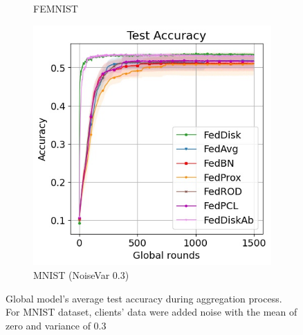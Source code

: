 \documentclass[journal]{IEEEtai}
\begin{document}
\begin{figure}[ht!]
\begin{subfigure}[t]{0.3\linewidth}
		\caption{FEMNIST}
		\label{fig:acc_femnist}
	\end{subfigure}
	\hspace{0.01em}%
	\begin{subfigure}[t]{0.3\linewidth}	
		\includegraphics[width=\linewidth]{Figures/mnist/test_acc}
		\caption{MNIST (NoiseVar 0.3)  }
		\label{fig:acc_mnist}
	\end{subfigure}
	\caption{Global model's average test accuracy during aggregation process. For MNIST dataset, clients' data were added noise with the mean of zero and variance of 0.3  }
	\label{fig:acc_all}
\end{figure}
\end{document}
